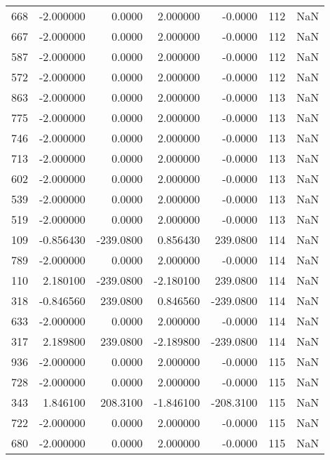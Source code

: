 \begin{tabular}{rrrrrrr}
 668 &   -2.000000 &    0.0000 &    2.000000 &     -0.0000 &         112 & NaN \\
 667 &   -2.000000 &    0.0000 &    2.000000 &     -0.0000 &         112 & NaN \\
 587 &   -2.000000 &    0.0000 &    2.000000 &     -0.0000 &         112 & NaN \\
 572 &   -2.000000 &    0.0000 &    2.000000 &     -0.0000 &         112 & NaN \\
 863 &   -2.000000 &    0.0000 &    2.000000 &     -0.0000 &         113 & NaN \\
 775 &   -2.000000 &    0.0000 &    2.000000 &     -0.0000 &         113 & NaN \\
 746 &   -2.000000 &    0.0000 &    2.000000 &     -0.0000 &         113 & NaN \\
 713 &   -2.000000 &    0.0000 &    2.000000 &     -0.0000 &         113 & NaN \\
 602 &   -2.000000 &    0.0000 &    2.000000 &     -0.0000 &         113 & NaN \\
 539 &   -2.000000 &    0.0000 &    2.000000 &     -0.0000 &         113 & NaN \\
 519 &   -2.000000 &    0.0000 &    2.000000 &     -0.0000 &         113 & NaN \\
 109 &   -0.856430 & -239.0800 &    0.856430 &    239.0800 &         114 & NaN \\
 789 &   -2.000000 &    0.0000 &    2.000000 &     -0.0000 &         114 & NaN \\
 110 &    2.180100 & -239.0800 &   -2.180100 &    239.0800 &         114 & NaN \\
 318 &   -0.846560 &  239.0800 &    0.846560 &   -239.0800 &         114 & NaN \\
 633 &   -2.000000 &    0.0000 &    2.000000 &     -0.0000 &         114 & NaN \\
 317 &    2.189800 &  239.0800 &   -2.189800 &   -239.0800 &         114 & NaN \\
 936 &   -2.000000 &    0.0000 &    2.000000 &     -0.0000 &         115 & NaN \\
 728 &   -2.000000 &    0.0000 &    2.000000 &     -0.0000 &         115 & NaN \\
 343 &    1.846100 &  208.3100 &   -1.846100 &   -208.3100 &         115 & NaN \\
 722 &   -2.000000 &    0.0000 &    2.000000 &     -0.0000 &         115 & NaN \\
 680 &   -2.000000 &    0.0000 &    2.000000 &     -0.0000 &         115 & NaN \\

\end{tabular}
